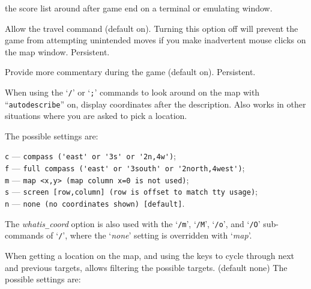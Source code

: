 the score list around after game end on a terminal or emulating window.
\item[\ib{travel}]
Allow the travel command (default on).  Turning this option off will
prevent the game from attempting unintended moves if you make inadvertent
mouse clicks on the map window.  Persistent.
\item[\ib{verbose}]
Provide more commentary during the game (default on).  Persistent.
\item[\ib{whatis\verb+_+coord}]
When using the `{\tt /}' or `{\tt ;}' commands to look around on the map with
``{\tt autodescribe}''
on, display coordinates after the description.
Also works in other situations where you are asked to pick a location.

The possible settings are:

{\tt c} --- \verb#compass ('east' or '3s' or '2n,4w')#;\\
{\tt f} --- \verb#full compass ('east' or '3south' or '2north,4west')#;\\
{\tt m} --- \verb#map <x,y> (map column x=0 is not used)#;\\
{\tt s} --- \verb#screen [row,column] (row is offset to match tty usage)#;\\
{\tt n} --- \verb#none (no coordinates shown) [default]#.

The
{\it whatis\verb+_+coord\/}
option is also used with
the `{\tt /m}', `{\tt /M}', `{\tt /o}', and `{\tt /O}' sub-commands
of `{\tt /}',
where the `{\it none\/}' setting is overridden with `{\it map}'.
\item[\ib{whatis\verb+_+filter}]
When getting a location on the map, and using the keys to cycle through
next and previous targets, allows filtering the possible targets.
(default none)
The possible settings are:

